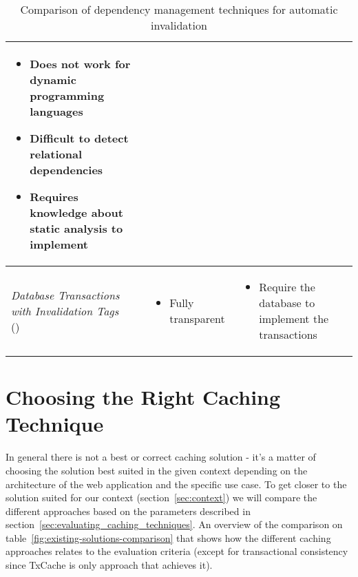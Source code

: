 \begin{table}[ht!]
\begin{tabular}{lll}
{{\begin{itemize}[leftmargin=0.75em]
          \item Does not work for dynamic programming languages
          \item Difficult to detect relational dependencies
          \item Requires knowledge about static analysis to implement
        \end{itemize}
      }
    } \\
    \hline
    {
      \parbox{3.5cm}{
        \emph{Database Transactions with Invalidation Tags} \\ (\cite{paper:liskov})
      }
    } & {
      \parbox{3.5cm}{
        \begin{itemize}[leftmargin=0.75em]
          \item Fully transparent
        \end{itemize}
      }
    } & {
      \parbox{3.5cm}{
        \begin{itemize}[leftmargin=0.75em]
          \item Require the database to implement the transactions
        \end{itemize}
      }
    } \\
    \hline
  \end{tabular}
  \caption{Comparison of dependency management techniques for automatic invalidation}
  \label{fig:dependency-management-comparison}
\end{table}



\section{Choosing the Right Caching Technique}
\label{sec:choosing_the_right_caching_technique}

In general there is not a best or correct caching solution - it's a matter of choosing the solution best suited in the given context depending on the architecture of the web application and the specific use case. To get closer to the solution suited for our context (section~\ref{sec:context}) we will compare the different approaches based on the parameters described in section~\ref{sec:evaluating_caching_techniques}. An overview of the comparison on table~\ref{fig:existing-solutions-comparison} that shows how the different caching approaches relates to the evaluation criteria (except for transactional consistency since TxCache is only approach that achieves it).

